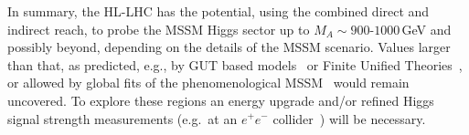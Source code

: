 In summary, the HL-LHC has the potential, using the combined direct and indirect reach, to probe the MSSM Higgs sector up to $M_A \sim 900$-$1000$\,GeV and possibly beyond, depending on the details of the MSSM scenario. Values larger than that, as predicted, e.g., by GUT based models~\cite{Buchmueller:2013rsa,Buchmueller:2014yva,Bechtle:2015nua,Bagnaschi:2016afc,Bagnaschi:2016xfg,Costa:2017gup} or Finite Unified Theories~\cite{Heinemeyer:2013nza,Heinemeyer:2018roq,Heinemeyer:2018zpw}, or allowed by global fits of the phenomenological MSSM~\cite{Bechtle:2016kui,Bagnaschi:2017tru} would remain uncovered. To explore these regions an energy upgrade and/or refined Higgs signal strength measurements (e.g.\ at an $e^+e^-$ collider~\cite{Moortgat-Picka:2015yla}) will be
necessary.